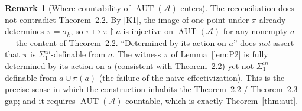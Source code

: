 \documentclass[12pt,fullpage]{article}
\theoremstyle{definition}
\newtheorem{remark}[theorem]{Remark}
\newcommand{\A}{\mathcal{A}}
\newcommand{\AUT}{\operatorname{AUT}}
\begin{document}
\begin{remark}[Where countability of $\AUT(\A)$ enters]
The reconciliation does not contradict Theorem~2.2.  By \ref{K1}, the image of
one point under $\pi$ already determines $\pi=\sigma_k$, so $\pi\mapsto\pi
\restriction\bar a$ is injective on $\AUT(\A)$ for any nonempty $\bar a$ --- the
content of Theorem~2.2.  ``Determined by its action on $\bar a$'' does
\emph{not} assert that $\pi$ is $\Sigma^{in}_1$-definable from $\bar a$.  The
witness $\pi$ of Lemma~\ref{lem:P2} is fully determined by its action on
$\bar a$ (consistent with Theorem~2.2) yet not $\Sigma^{in}_1$-definable from
$\bar a\cup\pi(\bar a)$ (the failure of the naive effectivization).  This is
the precise sense in which the construction inhabits the Theorem~2.2 /
Theorem~2.3 gap; and it requires $\AUT(\A)$ countable, which is exactly
Theorem~\ref{thm:aut}.
\end{remark}
\end{document}
